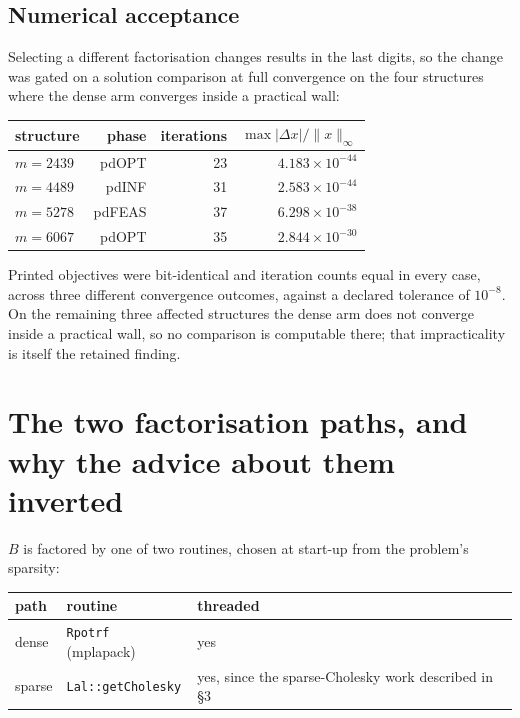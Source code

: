 \documentclass[11pt]{article}
\newcommand{\bMat}{B}
\newcommand{\code}[1]{\texttt{#1}}
\begin{document}
\subsection{Numerical acceptance}

Selecting a different factorisation changes results in the last digits, so the change was gated on
a solution comparison at full convergence on the four structures where the dense arm converges
inside a practical wall:

\begin{center}
\begin{tabular}{lrrr}
\toprule
structure & phase & iterations & $\max|\Delta x| / \|x\|_\infty$ \\
\midrule
$m=2439$ & pdOPT & 23 & $4.183\times10^{-44}$ \\
$m=4489$ & pdINF & 31 & $2.583\times10^{-44}$ \\
$m=5278$ & pdFEAS & 37 & $6.298\times10^{-38}$ \\
$m=6067$ & pdOPT & 35 & $2.844\times10^{-30}$ \\
\bottomrule
\end{tabular}
\end{center}

Printed objectives were bit-identical and iteration counts equal in every case, across three
different convergence outcomes, against a declared tolerance of $10^{-8}$. On the remaining three
affected structures the dense arm does not converge inside a practical wall, so no comparison is
computable there; that impracticality is itself the retained finding.

\section{The two factorisation paths, and why the advice about them inverted}
\label{sec:paths}

$\bMat$ is factored by one of two routines, chosen at start-up from the problem's sparsity:

\begin{center}
\begin{tabular}{lll}
\toprule
path & routine & threaded \\
\midrule
dense & \code{Rpotrf} (mplapack) & yes \\
sparse & \code{Lal::getCholesky} & yes, since the sparse-Cholesky work described in \S3 \\
\bottomrule
\end{tabular}
\end{center}
\end{document}
